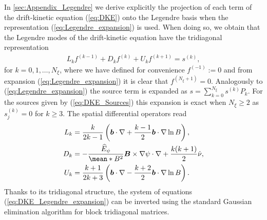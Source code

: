   
 In \ref{sec:Appendix_Legendre} we derive explicitly the projection of each term of the drift-kinetic equation (\ref{eq:DKE}) onto the Legendre basis when the representation (\ref{eq:Legendre_expansion}) is used. When doing so, we obtain that the Legendre modes of the drift-kinetic equation have the tridiagonal representation  
 \begin{align}
 	L_k f^{(k-1)} + D_k f^{(k)} + U_k f^{(k+1)} = s^{(k)},  
 	\label{eq:DKE_Legendre_expansion}
 \end{align}
 for $k=0,1,\ldots ,N_\xi$, where we have defined for convenience $f^{(-1)}:=0$ and from expansion (\ref{eq:Legendre_expansion}) it is clear that $f^{(N_\xi+1)}=0$. Analogously to (\ref{eq:Legendre_expansion}) the source term is expanded as $s=\sum_{k=0}^{N_\xi} s^{(k)} P_k$. For the sources given by (\ref{eq:DKE_Sources}) this expansion is exact when $N_\xi\ge2$ as $s_j^{(k)}=0$ for $k\ge 3$. The spatial differential operators read 
 \begin{align}
 	L_k & = 
 	\frac{k}{2k-1} 
 	\left(
 	\vb*{b} \cdot \nabla 
 	+
 	\frac{k-1}{2}
 	\vb*{b}\cdot\nabla \ln B
 	\right), \label{eq:DKE_Legendre_expansion_Lower}
 	\\ 
 	D_k & = - 
 	\frac{\widehat{E}_\psi}{\mean*{B^2}}
 	\vb*{B}\times \nabla\psi  \cdot \nabla 
 	+  
 	\frac{k(k+1)}{2}
 	\hat{\nu} , \label{eq:DKE_Legendre_expansion_Diagonal}
 	\\
 	U_k & =  
 	\frac{k+1}{2k+3} 
 	\left(
 	\vb*{b} \cdot \nabla 
 	-
 	\frac{k+2}{2}
 	\vb*{b}\cdot\nabla \ln B
 	\right). \label{eq:DKE_Legendre_expansion_Upper}
 \end{align}
Thanks to its tridiagonal structure, the system of equations (\ref{eq:DKE_Legendre_expansion}) can be inverted using the standard Gaussian elimination algorithm for block tridiagonal matrices. 


